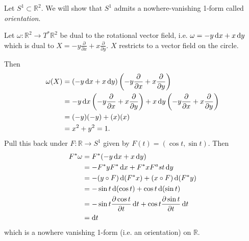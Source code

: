 \begin{xmpl}
Let $S^1 \subset \mathbb{R}^2$. We will show that $S^1$ admits a
nowhere-vanishing 1-form called \emph{orientation}.

Let $\omega : \mathbb{R}^2 \to T^\ast \mathbb{R}^2$ be dual to the
rotational vector field, i.e.
$\omega = -y \mathop{}\!\mathrm{d} x + x \mathop{}\!\mathrm{d} y$ which is dual to
$X = -y \frac{\partial}{\partial x} + x \frac{\partial}{\partial y}$.
$X$ restricts to a vector field on the circle.

Then
\begin{align*}
   \omega(X)
&= (-y \mathop{}\!\mathrm{d} x + x \mathop{}\!\mathrm{d} y)
     \left(
     - y \frac{\partial}{\partial x}
     + x \frac{\partial}{\partial y}
     \right) \\
&= - y \mathop{}\!\mathrm{d} x
   \left(
   - y \frac{\partial}{\partial x}
   + x \frac{\partial}{\partial y}
   \right)
   + x \mathop{}\!\mathrm{d} y
   \left(
   - y \frac{\partial}{\partial x}
   + x \frac{\partial}{\partial y}
   \right) \\
&= (-y)(-y) + (x)(x) \\
&= x^2 + y^2 = 1.
\end{align*}
Pull this back under $F: \mathbb{R} \to S^1$ given by
$F(t) = (\cos t, \sin t)$. Then
\begin{align*}
   F^\ast \omega
&= F^\ast(-y \dif x + x \dif y) \\
&= -F^\ast y F^\ast \dif x
 + F^\ast x F^ast \dif y \\
&= -(y \circ F) \dif (F^\ast x)
 + (x \circ F) \dif(F^\ast y) \\
&= -\sin t \dif (\cos t)
 + \cos t \dif (\sin t) \\
&= -\sin t
    \frac{\partial \cos t}{\partial t}
    \dif t
 + \cos t
    \frac{\partial \sin t}{\partial t}
    \dif t \\
&= \dif t
\end{align*}
which is a nowhere vanishing 1-form (i.e. an orientation) on $\mathbb{R}$.
\end{xmpl}

